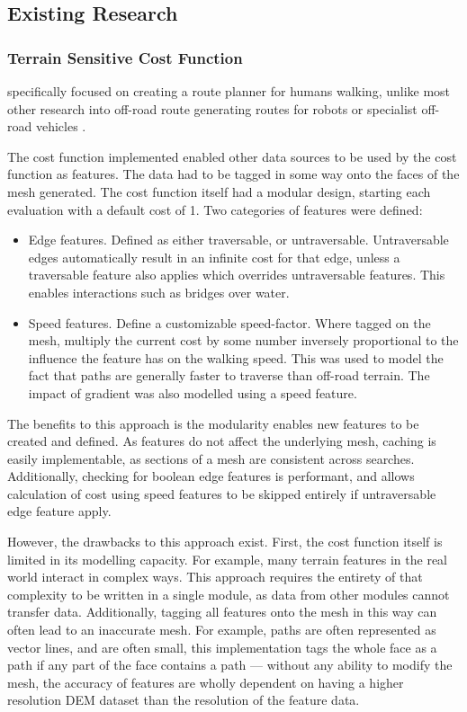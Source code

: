 \documentclass[12pt]{article}
\begin{document}
\subsection{Existing Research}

\subsubsection{Terrain Sensitive Cost Function}

\autocite{evans2023tsr} specifically focused on creating a route planner for humans walking, unlike most other research into off-road route generating routes for robots or specialist off-road vehicles \autocite{perkins2013fielddstar,zhao2024searchrescue}.

The cost function implemented enabled other data sources to be used by the cost function as features. The data had to be tagged in some way onto the faces of the mesh generated. The cost function itself had a modular design, starting each evaluation with a default cost of 1. Two categories of features were defined:

\begin{itemize}
  \item Edge features. Defined as either traversable, or untraversable. Untraversable edges automatically result in an infinite cost for that edge, unless a traversable feature also applies which overrides untraversable features. This enables interactions such as bridges over water.
  \item Speed features. Define a customizable speed-factor. Where tagged on the mesh, multiply the current cost by some number inversely proportional to the influence the feature has on the walking speed. This was used to model the fact that paths are generally faster to traverse than off-road terrain. The impact of gradient was also modelled using a speed feature.
\end{itemize}

The benefits to this approach is the modularity enables new features to be created and defined. As features do not affect the underlying mesh, caching is easily implementable, as sections of a mesh are consistent across searches. Additionally, checking for boolean edge features is performant, and allows calculation of cost using speed features to be skipped entirely if untraversable edge feature apply.

However, the drawbacks to this approach exist. First, the cost function itself is limited in its modelling capacity. For example, many terrain features in the real world interact in complex ways. This approach requires the entirety of that complexity to be written in a single module, as data from other modules cannot transfer data. Additionally, tagging all features onto the mesh in this way can often lead to an inaccurate mesh. For example, paths are often represented as vector lines, and are often small, this implementation tags the whole face as a path if any part of the face contains a path --- without any ability to modify the mesh, the accuracy of features are wholly dependent on having a higher resolution DEM dataset than the resolution of the feature data.
\end{document}
